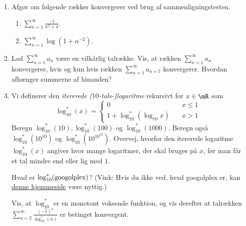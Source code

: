 \begin{opg} \hfill
\begin{enumerate}
	 \item Afgør om følgende rækker konvergerer ved brug af sammenligningstesten.
	
	\begin{enumerate}[label=\roman*)]
		\item $\displaystyle\sum_{n=1}^\infty \frac{-1}{n^2+4}$.
		\item $\displaystyle\sum_{n=1}^\infty \log (1 + n^{-2})$.
	\end{enumerate}

    \item Lad $\sum_{n=1}^\infty a_n$ være en vilkårlig talrække. Vis, at rækken $\sum_{n=1}^\infty a_n$ konvergerer, hvis og kun hvis rækken $\sum_{n=1}^\infty a_{n+5}$ konvergerer. Hvordan afhænger summerne af hinanden?
	\item Vi definerer den \textit{itererede ($10$-tals-)logaritme} rekursivt for $x\in \mR$ som
	$$ \log^\ast_{10}(x) = \begin{cases}
	    0 &\quad x\leq 1 \\
	    1+ \log^\ast_{10}(\log_{10} x) &\quad x>1
	\end{cases} $$
	Beregn $\log^\ast_{10}(10), \log^\ast_{10}(100)$ og $\log^\ast_{10}(1000)$. Beregn også $\log^\ast_{10}(10^{10})$ og $\log^\ast_{10}(10^{10^{10}})$. Overvej, hvorfor den itererede logaritme $\log^\ast_{10}(x)$ angiver hvor mange logaritmer, der skal bruges på $x$, før man får et tal mindre end eller lig med $1$. 
	
	Hvad er $\log^\ast_{10}(\textnormal{googolplex})$? (Vink: Hvis du ikke ved, hvad googolplex er, kan \href{https://www.google.com}{denne hjemmeside} være nyttig.) 
	
	Vis, at $\log^\ast_{10}$ er en monotont voksende funktion, og vis derefter at talrækken $\sum_{n=2}^\infty \frac{(-1)^n}{\log^\ast_{10} (n)}$ er betinget konvergent.
\end{enumerate}
\end{opg}

